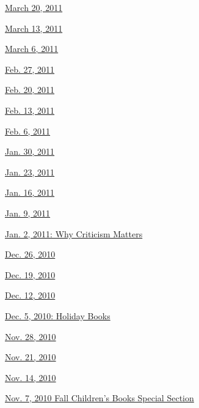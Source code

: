 \href{http://www.nytimes.com/indexes/2011/03/19/books/review/index.html}{March
20, 2011}

\href{http://www.nytimes.com/indexes/2011/03/12/books/review/index.html}{March
13, 2011}

\href{http://www.nytimes.com/indexes/2011/03/05/books/review/index.html}{March
6, 2011}

\href{http://www.nytimes.com/indexes/2011/02/26/books/review/index.html}{Feb.
27, 2011}

\href{http://www.nytimes.com/indexes/2011/02/19/books/review/index.html}{Feb.
20, 2011}

\href{http://www.nytimes.com/indexes/2011/02/12/books/review/index.html}{Feb.
13, 2011}

\href{http://www.nytimes.com/indexes/2011/02/05/books/review/index.html}{Feb.
6, 2011}

\href{http://www.nytimes.com/indexes/2011/01/29/books/review/index.html}{Jan.
30, 2011}

\href{http://www.nytimes.com/indexes/2011/01/22/books/review/index.html}{Jan.
23, 2011}

\href{http://www.nytimes.com/indexes/2011/01/15/books/review/index.html}{Jan.
16, 2011}

\href{http://www.nytimes.com/indexes/2011/01/08/books/review/index.html}{Jan.
9, 2011}

\href{http://www.nytimes.com/indexes/2011/01/01/books/review/index.html}{Jan.
2, 2011: Why Criticism Matters}

\href{http://www.nytimes.com/indexes/2010/12/25/books/review/index.html}{Dec.
26, 2010}

\href{http://www.nytimes.com/indexes/2010/12/18/books/review/index.html}{Dec.
19, 2010}

\href{http://www.nytimes.com/indexes/2010/12/11/books/review/index.html}{Dec.
12, 2010}

\href{http://www.nytimes.com/indexes/2010/12/04/books/review/index.html}{Dec.
5, 2010: Holiday Books}

\href{http://www.nytimes.com/indexes/2010/11/27/books/review/index.html}{Nov.
28, 2010}

\href{http://www.nytimes.com/indexes/2010/11/20/books/review/index.html}{Nov.
21, 2010}

\href{http://www.nytimes.com/indexes/2010/11/13/books/review/index.html}{Nov.
14, 2010}

\href{http://www.nytimes.com/indexes/2010/11/06/books/review/index.html}{Nov.
7, 2010 \textbar{} Fall Children's Books Special Section}

